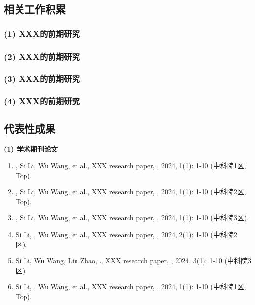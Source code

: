 \documentclass[UTF8,12pt,AutoFakeBold=2]{ctexart}
\begin{document}
\subsection{相关工作积累}

\subsubsection*{(1) XXX的前期研究}

\subsubsection*{(2) XXX的前期研究}

\subsubsection*{(3) XXX的前期研究}

\subsubsection*{(4) XXX的前期研究}

\subsection{代表性成果}

\noindent\textbf{(1) 学术期刊论文}
\begin{sloppypar}
	\small
	\begin{enumerate}[align=right, labelindent=0pt, itemindent=0pt, leftmargin=\parindent]
            \item {}, Si Li, Wu Wang, et al., XXX research paper, , 2024, 1(1): 1-10 (中科院1区, Top).
            \item {}, Si Li, Wu Wang, et al., XXX research paper, , 2024, 1(1): 1-10 (中科院2区, Top).
            \item {}, Si Li, Wu Wang, et al., XXX research paper, , 2024, 1(1): 1-10 (中科院3区).
            \item Si Li\dag, ,  Wu Wang, et al., XXX research paper, , 2024, 2(1): 1-10 (中科院2区).  
            \item Si Li, Wu Wang, Liu Zhao, ., XXX research paper, , 2024, 3(1): 1-10 (中科院3区).
            \item Si Li, ,  Wu Wang, et al., XXX research paper, , 2024, 1(1): 1-10 (中科院1区, Top).
	\end{enumerate}
\end{sloppypar}
\end{document}
